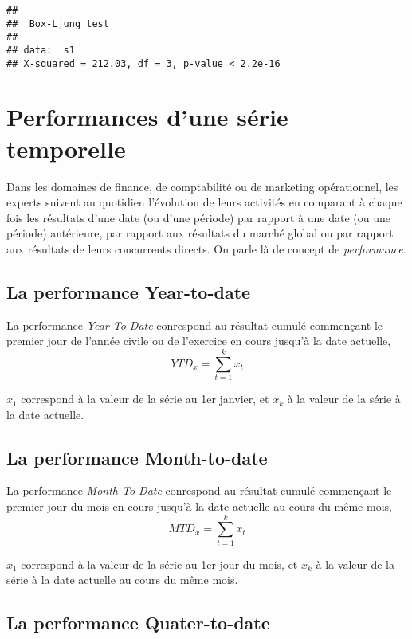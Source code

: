 \documentclass[
]{book}
\theoremstyle{definition}
\theoremstyle{definition}
\theoremstyle{definition}
\theoremstyle{definition}
\theoremstyle{remark}
\begin{document}
\begin{verbatim}
## 
##  Box-Ljung test
## 
## data:  s1
## X-squared = 212.03, df = 3, p-value < 2.2e-16
\end{verbatim}

\hypertarget{performances-dune-suxe9rie-temporelle}{%
\section{Performances d'une série temporelle}\label{performances-dune-suxe9rie-temporelle}}

Dans les domaines de finance, de comptabilité ou de marketing opérationnel, les experts suivent au quotidien l'évolution de leurs activités en comparant à chaque fois les résultats d'une date (ou d'une période) par rapport à une date (ou une période) antérieure, par rapport aux résultats du marché global ou par rapport aux résultats de leurs concurrents directs. On parle là de concept de \emph{performance}.

\hypertarget{la-performance-year-to-date}{%
\subsection{La performance Year-to-date}\label{la-performance-year-to-date}}

La performance \emph{Year-To-Date} conrespond au résultat cumulé commençant le premier jour de l'année civile ou de l'exercice en cours jusqu'à la date actuelle,
\[YTD_x = \sum_{t=1}^{k} x_{t}\]

\(x_1\) correspond à la valeur de la série au 1er janvier, et \(x_k\) à la valeur de la série à la date actuelle.

\hypertarget{la-performance-month-to-date}{%
\subsection{La performance Month-to-date}\label{la-performance-month-to-date}}

La performance \emph{Month-To-Date} conrespond au résultat cumulé commençant le premier jour du mois en cours jusqu'à la date actuelle au cours du même mois,
\[MTD_x = \sum_{t=1}^{k} x_{t}\]

\(x_1\) correspond à la valeur de la série au 1er jour du mois, et \(x_k\) à la valeur de la série à la date actuelle au cours du même mois.

\hypertarget{la-performance-quater-to-date}{%
\subsection{La performance Quater-to-date}\label{la-performance-quater-to-date}}
\end{document}
